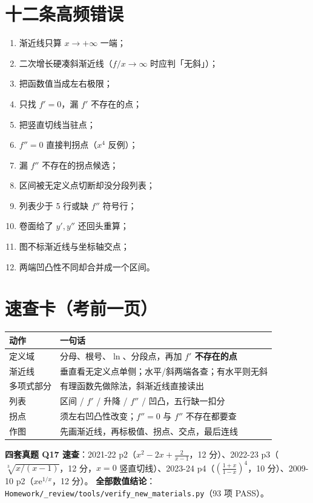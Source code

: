 \documentclass[11pt,a4paper]{ctexart}
\newcommand{\ee}{\mathrm{e}}
\begin{document}
\section{十二条高频错误}

\begin{enumerate}[label=\arabic*.,leftmargin=2em]
\item 渐近线只算 $x\to+\infty$ 一端；\item 二次增长硬凑斜渐近线（$f/x\to\infty$ 时应判「无斜」）；
\item 把函数值当成左右极限；\item 只找 $f'=0$，漏 $f'$ 不存在的点；
\item 把竖直切线当驻点；\item $f''=0$ 直接判拐点（$x^4$ 反例）；
\item 漏 $f''$ 不存在的拐点候选；\item 区间被无定义点切断却没分段列表；
\item 列表少于 5 行或缺 $f''$ 符号行；\item 卷面给了 $y',y''$ 还回头重算；
\item 图不标渐近线与坐标轴交点；\item 两端凹凸性不同却合并成一个区间。
\end{enumerate}

\section{速查卡（考前一页）}

\begin{center}
\begin{tabularx}{15.2cm}{@{}l X@{}}
\toprule
动作 & 一句话 \\
\midrule
定义域 & 分母、根号、$\ln$、分段点，再加 \textbf{$f'$ 不存在的点} \\
渐近线 & 垂直看无定义点单侧；水平/斜两端各查；有水平则无斜 \\
多项式部分 & 有理函数先做除法，斜渐近线直接读出 \\
列表 & 区间 / $f'$ / 升降 / $f''$ / 凹凸，五行缺一扣分 \\
拐点 & 须左右凹凸性改变；$f''=0$ 与 $f''$ 不存在都要查 \\
作图 & 先画渐近线，再标极值、拐点、交点，最后连线 \\
\bottomrule
\end{tabularx}
\end{center}

\vspace{4pt}
\noindent\textbf{四套真题 Q17 速查}：2021-22 p2（$x^2-2x+\frac2{x-1}$，12 分）、2022-23 p3（$\sqrt[3]{x/(x-1)}$，12 分，$x=0$ 竖直切线）、2023-24 p4（$(\frac{1+x}{1-x})^4$，10 分）、2009-10 p2（$x\ee^{1/x}$，12 分）。
\textbf{全部数值结论}：\texttt{Homework/\_review/tools/verify\_new\_materials.py}（93 项 PASS）。
\end{document}
